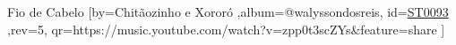 \beginsong
{Fio de Cabelo %
}[by={Chitãozinho e Xororó %
},album={@walyssondosreis},
id={\href{https://music.youtube.com/watch?v=zpp0t3scZYs&feature=share %
}{ST0093 %
}},rev={5}, %
qr={https://music.youtube.com/watch?v=zpp0t3scZYs&feature=share %
}]
\beginverse
